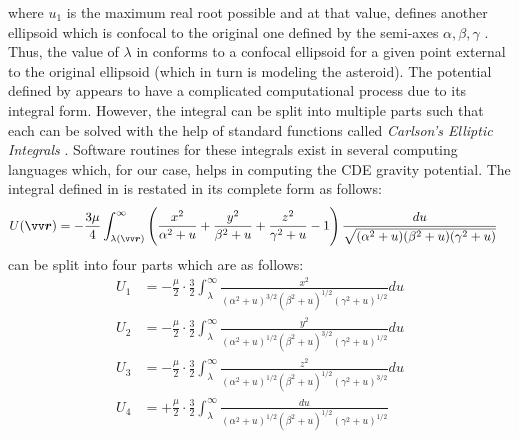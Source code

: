 where $u_1$ is the maximum real root possible and at that value,  defines another ellipsoid which is confocal to the original one defined by the semi-axes $\alpha, \beta, \gamma$ \parencite{ellipsoid_potential_model}. Thus, the value of $\lambda$ in  conforms to a confocal ellipsoid for a given point external to the original ellipsoid (which in turn is modeling the asteroid).
%
\newline\newline
%
The potential defined by  appears to have a complicated computational process due to its integral form. However, the integral can be split into multiple parts such that each can be solved with the help of standard functions called \textit{Carlson's Elliptic Integrals} \parencite{carlsonEllipticIntegral}. Software routines for these integrals exist in several computing languages which, for our case, helps in computing the \gls{CDE} gravity potential. The integral defined in  is restated in its complete form as follows:
\begin{align}
    U(\bvector{r}) &= -\frac{3\mu}{4} \int_{\lambda(\bvector{r})}^{\infty} \left(\frac{x^2}{\alpha^2 + u} + \frac{y^2}{\beta^2 + u} + \frac{z^2}{\gamma^2 + u} - 1\right) \frac{du}{\sqrt{(\alpha^2 + u)(\beta^2 + u)(\gamma^2 + u)}}
    \label{eqn:ellipsoid_potential_long_form}
\end{align}
 can be split into four parts which are as follows:
\begin{align}
    U_1 &= -\frac{\mu}{2} \cdotp \frac{3}{2} \int_{\lambda}^{\infty} \frac{x^2}{(\alpha^2 + u)^{3/2}(\beta^2 + u)^{1/2}(\gamma^2 + u)^{1/2}} du
    \label{eqn:ellipsoid_potential_split_1}\\
    U_2 &= -\frac{\mu}{2} \cdotp \frac{3}{2} \int_{\lambda}^{\infty} \frac{y^2}{(\alpha^2 + u)^{1/2}(\beta^2 + u)^{3/2}(\gamma^2 + u)^{1/2}} du
    \label{eqn:ellipsoid_potential_split_2}\\
    U_3 &= -\frac{\mu}{2} \cdotp \frac{3}{2} \int_{\lambda}^{\infty} \frac{z^2}{(\alpha^2 + u)^{1/2}(\beta^2 + u)^{1/2}(\gamma^2 + u)^{3/2}} du
    \label{eqn:ellipsoid_potential_split_3}\\
    U_4 &= +\frac{\mu}{2} \cdotp \frac{3}{2} \int_{\lambda}^{\infty} \frac{du}{(\alpha^2 + u)^{1/2}(\beta^2 + u)^{1/2}(\gamma^2 + u)^{1/2}}
    \label{eqn:ellipsoid_potential_split_4}
\end{align}
